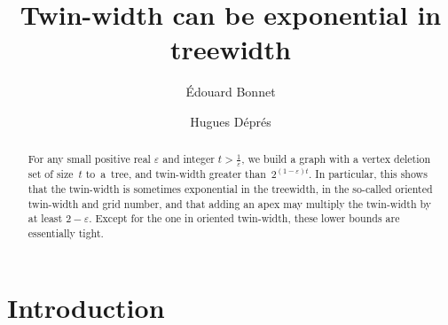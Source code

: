 \documentclass[a4paper,UKenglish,cleveref,hyperref,autoref]{lipics-v2021}
\title{Twin-width can be exponential in treewidth}
\author{\'{E}douard Bonnet}{Univ Lyon, CNRS, ENS de Lyon, Université Claude Bernard Lyon 1, LIP UMR5668, France \and \url{http://perso.ens-lyon.fr/edouard.bonnet/}}{edouard.bonnet@ens-lyon.fr}{https://orcid.org/0000-0002-1653-5822}{}
\author{Hugues Déprés}{Univ Lyon, CNRS, ENS de Lyon, Université Claude Bernard Lyon 1, LIP UMR5668, France \and \url{http://perso.ens-lyon.fr/hugues.depres/}}{hugues.depres@ens-lyon.fr}{}{}
\begin{document}
\maketitle

\begin{abstract}
  For any small positive real $\varepsilon$ and integer $t > \frac{1}{\varepsilon}$, we build a graph with a vertex deletion set of size~$t$ to~a~tree, and twin-width greater than~$2^{(1-\varepsilon) t}$.
  In particular, this shows that the twin-width is sometimes exponential in the treewidth, in the so-called oriented twin-width and grid number, and that adding an apex may multiply the twin-width by at least $2-\varepsilon$.
 Except for the one in oriented twin-width, these lower bounds are essentially tight. 
\end{abstract}

\section{Introduction}\label{sec:intro}
\end{document}

